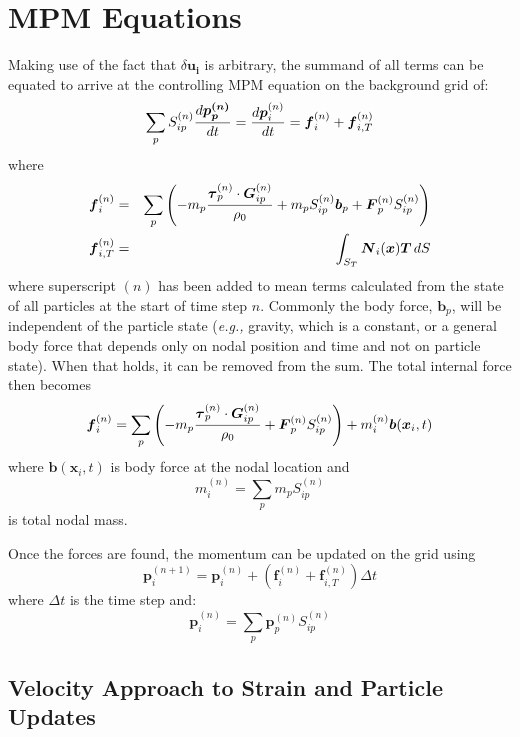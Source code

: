 \documentclass[11pt]{article}
\renewcommand{\vec}[1]{\boldsymbol{#1}}
\newcommand{\tens}[1]{\boldsymbol{\mathsf{#1}}}
\begin{document}
\section{MPM Equations}

Making use of the fact that $\delta\vec{u_i}$ is arbitrary, the summand of all terms can be equated to arrive at the controlling MPM equation on the background grid of:
\begin{equation}
    \sum_p S_{ip}^{(n)} {d\vec{ p_p^{(n)}}\over dt} = {d\vec p_i^{(n)}\over dt} = \vec f_i^{(n)} + \vec f_{i,T} ^{(n)}            \label{momEq}
\end{equation}
where
\begin{eqnarray}
	 \vec f_i^{(n)} & = & \sum_p \left(-m_p{\tens\tau_p^{(n)}\cdot \vec G_{ip}^{(n)}\over \rho_0}  + m_p S_{ip}^{(n)}  \vec b_p +  \vec F_p^{(n)}S_{ip}^{(n)}\right) \\
	 \vec f_{i,T}^{(n)} & = & \int_{S_T}\vec N_i(\vec x) \vec T \thinspace dS
\end{eqnarray}
where superscript $(n)$ has been added to mean terms calculated from the state of all particles at the start of time step $n$. Commonly the body force, $\vec b_p$, will be independent of the particle state ({\em e.g.,} gravity, which is a constant, or a general body force that depends only on nodal position and time and not on particle state). When that holds, it can be removed from the sum. The total internal force then becomes
\begin{equation}
	 \vec f_i^{(n)} = \sum_p \left(-m_p{\tens\tau_p^{(n)}\cdot \vec G_{ip}^{(n)}\over \rho_0}  +  \vec F_p^{(n)}S_{ip}^{(n)}\right)  + m_i^{(n)}\vec b(\vec x_i,t) 
	 \label{fidef}
\end{equation}
where $\vec b(\vec x_i,t)$ is body force at the nodal location and
\begin{equation}
	 m_i^{(n)} = \sum_p m_p S_{ip}^{(n)} 
\end{equation}
is total nodal mass.

Once the forces are found, the momentum can be updated on the grid using
\begin{equation}
           \vec p_i^{(n+1)} = \vec p_i^{(n)} + (\vec f_i^{(n)} + \vec f_{i,T}^{(n)})\Delta t
\end{equation}
where $\Delta t$ is the time step and:
\begin{equation}
         	 \vec{p}_i^{(n)} = \sum_p \vec{p}_p^{(n)} S_{ip}^{(n)} 
\end{equation}

\subsection{Velocity Approach to Strain and Particle Updates}
\end{document}
